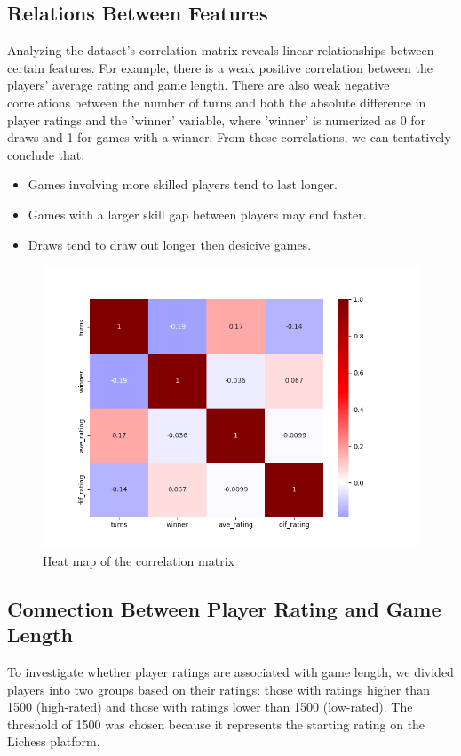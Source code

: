 \documentclass[conference]{IEEEtran}
\begin{document}
\subsection{Relations Between Features}
Analyzing the dataset’s correlation matrix reveals linear relationships between certain features. For example, there is a weak positive correlation between the players' average rating and game length. There are also weak negative correlations between the number of turns and both the absolute difference in player ratings and the 'winner' variable, where 'winner' is numerized as 0 for draws and 1 for games with a winner. From these correlations, we can tentatively conclude that:
\begin{itemize}
    \item Games involving more skilled players tend to last longer.
 
    \item Games with a larger skill gap between players may end faster.

    \item Draws tend to draw out longer then desicive games.
\end{itemize}

\begin{figure}[H]
    \centering
    \includegraphics[width=0.8\linewidth]{corr_mat.png}
    \caption{Heat map of the correlation matrix}
    \label{fig:corr_mat}
\end{figure}

\subsection{Connection Between Player Rating and Game Length}
To investigate whether player ratings are associated with game length, we divided players into two groups based on their ratings: those with ratings higher than 1500 (high-rated) and those with ratings lower than 1500 (low-rated). The threshold of 1500 was chosen because it represents the starting rating on the Lichess platform.
\end{document}
